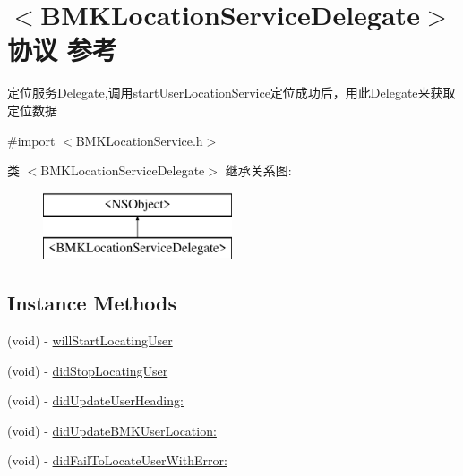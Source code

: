 \hypertarget{protocol_b_m_k_location_service_delegate-p}{}\section{$<$B\+M\+K\+Location\+Service\+Delegate$>$协议 参考}
\label{protocol_b_m_k_location_service_delegate-p}


定位服务\+Delegate,调用start\+User\+Location\+Service定位成功后，用此\+Delegate来获取定位数据  




{\ttfamily \#import $<$B\+M\+K\+Location\+Service.\+h$>$}

类 $<$B\+M\+K\+Location\+Service\+Delegate$>$ 继承关系图\+:\begin{figure}[H]
\begin{center}
\leavevmode
\includegraphics[height=2.000000cm]{protocol_b_m_k_location_service_delegate-p}
\end{center}
\end{figure}
\subsection*{Instance Methods}
\begin{DoxyCompactItemize}
\item 
(void) -\/ \hyperlink{protocol_b_m_k_location_service_delegate-p_a787a16ba232723b8c9594b468ce6714c}{will\+Start\+Locating\+User}
\item 
(void) -\/ \hyperlink{protocol_b_m_k_location_service_delegate-p_a03d0086502462319e2a007b837dc7e26}{did\+Stop\+Locating\+User}
\item 
(void) -\/ \hyperlink{protocol_b_m_k_location_service_delegate-p_a93b210b6948016039b9286cdb350cf13}{did\+Update\+User\+Heading\+:}
\item 
(void) -\/ \hyperlink{protocol_b_m_k_location_service_delegate-p_a3e9ba0b7fca0295aa46a2ad5a179645d}{did\+Update\+B\+M\+K\+User\+Location\+:}
\item 
(void) -\/ \hyperlink{protocol_b_m_k_location_service_delegate-p_a8653218e26f920bf67513c2c4fffb5be}{did\+Fail\+To\+Locate\+User\+With\+Error\+:}
\end{DoxyCompactItemize}


